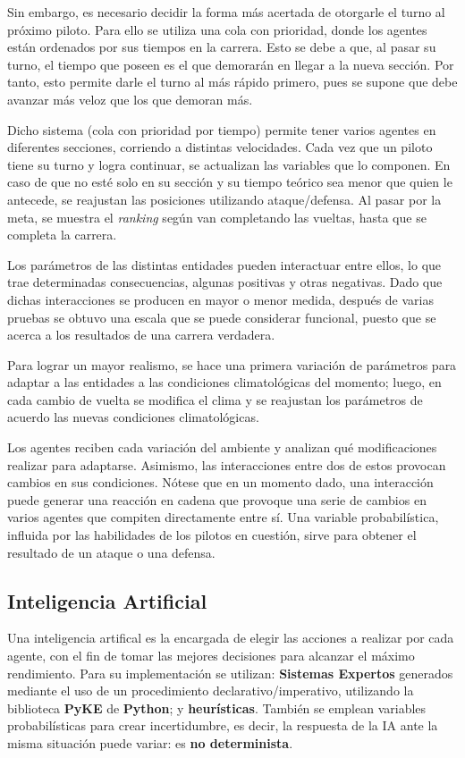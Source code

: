 \documentclass[12pt, letterpaper,spanish]{article}
\theoremstyle{definition}
\theoremstyle{remark}
\begin{document}
		Sin embargo, es necesario decidir la forma más acertada de otorgarle el turno al próximo piloto. Para ello se utiliza una cola con prioridad, donde los agentes están ordenados por sus tiempos en la carrera. Esto se debe a que, al pasar su turno, el tiempo que poseen es el que demorarán en llegar a la nueva sección. Por tanto, esto permite darle el turno al más rápido primero, pues se supone que debe avanzar más veloz que los que demoran más.

		Dicho sistema (cola con prioridad por tiempo) permite tener varios agentes en diferentes secciones, corriendo a distintas velocidades. Cada vez que un piloto tiene su turno y logra continuar, se actualizan las variables que lo componen. En caso de que no esté solo en su sección y su tiempo teórico sea menor que quien le antecede, se reajustan las posiciones utilizando ataque/defensa. Al pasar por la meta, se muestra el \emph{ranking} según van completando las vueltas, hasta que se completa la carrera.

		Los parámetros de las distintas entidades pueden interactuar entre ellos, lo que trae determinadas consecuencias, algunas positivas y otras negativas. Dado que dichas interacciones se producen en mayor o menor medida, después de varias pruebas se obtuvo una escala que se puede considerar funcional, puesto que se acerca a los resultados de una carrera verdadera. 

		Para lograr un mayor realismo, se hace una primera variación de parámetros para adaptar a las entidades a las condiciones climatológicas del momento; luego, en cada cambio de vuelta se modifica el clima y se reajustan los parámetros de acuerdo las nuevas condiciones climatológicas.

		Los agentes reciben cada variación del ambiente y analizan qué modificaciones realizar para adaptarse. Asimismo, las interacciones entre dos de estos provocan cambios en sus condiciones. Nótese que en un momento dado, una interacción puede generar una reacción en cadena que provoque una serie de cambios en varios agentes que compiten directamente entre sí. Una variable probabilística, influida por las habilidades de los pilotos en cuestión, sirve para obtener el resultado de un ataque o una defensa.

	\newpage

	\subsection{Inteligencia Artificial  {\footnotesize \cite{conferenciasIA}\cite{russell}}}
	Una inteligencia artifical es la encargada de elegir las acciones a realizar por cada agente, con el fin de tomar las mejores decisiones para alcanzar el máximo rendimiento. Para su implementación se utilizan: \textbf{Sistemas Expertos} generados mediante el uso de un procedimiento declarativo/imperativo, utilizando la biblioteca \textbf{PyKE}{\footnotesize \cite{pyke}} de \textbf{Python}; y \textbf{heurísticas}. También se emplean variables probabilísticas para crear incertidumbre, es decir, la respuesta de la IA ante la misma situación puede variar: es \textbf{no determinista}.
	
\end{document}
